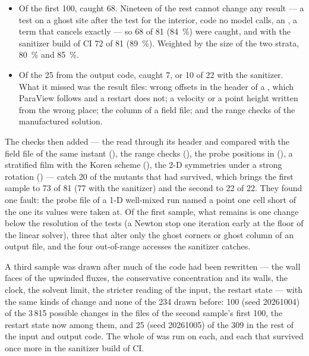 \begin{itemize}
  \item Of the first 100,  caught 68. Nineteen of the rest cannot
    change any result --- a test on a ghost site after the test for the
    interior, code no model calls, an , a term that cancels
    exactly --- so 68 of 81 (\SI{84}{\percent}) were caught, and with the
    sanitizer build of CI 72 of 81 (\SI{89}{\percent}). Weighted by the size
    of the two strata, \SI{80}{\percent} and \SI{85}{\percent}.
  \item Of the 25 from the output code,  caught 7, or 10 of 22
    with the sanitizer. What it missed was the result files: wrong offsets in
    the header of a , which ParaView follows and a restart does
    not; a velocity or a point height written from the wrong place; the
     column of a  field file; and the range checks of the
    manufactured solution.
\end{itemize}

The checks then added --- the  read through its header and
compared with the field file of the same instant (),
the range checks (), the probe positions in 
(), a stratified  film with the Koren scheme
(), the 2-D symmetries under a strong rotation
() --- catch 20 of the mutants that had survived, which
brings the first sample to 73 of 81 (77 with the sanitizer) and the second to
22 of 22. They found one fault: the probe file of a 1-D well-mixed run named a
point one cell short of the one its values were taken at. Of the first
sample, what remains is one change below the resolution of the tests (a
Newton stop one iteration early at the floor of the linear solver), three
that alter only the ghost corners or ghost column of an output file, and the
four out-of-range accesses the sanitizer catches.

A third sample was drawn after much of the code had been rewritten --- the
wall faces of the upwinded fluxes, the conservative  concentration
and its walls, the clock, the solvent limit, the stricter reading of the
input, the restart state --- with the same kinds of change and none of the
234 drawn before: 100 (seed 20261004) of the 3\,815 possible changes in the
files of the second sample's first 100, the restart state now among them,
and 25 (seed 20261005) of the 309 in the rest of the input and output code.
The whole of  was run on each, and each that survived once more
in the sanitizer build of CI.

